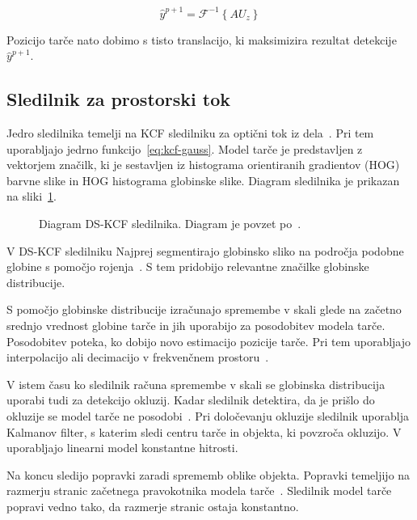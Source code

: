 \begin{equation}
\hat{y}^{p + 1} = \mathcal{F}^{-1}\left\{ A U_z \right\}
\label{eq:detection-score}
\end{equation}

Pozicijo tarče nato dobimo s tisto translacijo, ki maksimizira rezultat detekcije $\hat{y}^{p+1}$.












\subsection{Sledilnik za prostorski tok}
Jedro sledilnika temelji na KCF sledilniku za optični tok iz dela~\cite{henriques2015high}. Pri tem uporabljajo jedrno funkcijo~\eqref{eq:kcf-gauss}. Model tarče je predstavljen z vektorjem značilk, ki je sestavljen iz histograma orientiranih gradientov (HOG) barvne slike in HOG histograma globinske slike. Diagram sledilnika je prikazan na sliki~\ref{fig:diagram-dskcf}.

\begin{figure}[htb]
	\centering
	
	\caption[Diagram DS-KCF sledilnika]{Diagram DS-KCF sledilnika. Diagram je povzet po~\cite{hannuna2016ds}.}
	\label{fig:diagram-dskcf}
\end{figure}

V DS-KCF sledilniku Najprej segmentirajo globinsko sliko na področja podobne globine s pomočjo rojenja~\cite{hannuna2016ds}. S tem pridobijo relevantne značilke globinske distribucije. 

S pomočjo globinske distribucije izračunajo spremembe v skali glede na začetno srednjo vrednost globine tarče in jih uporabijo za posodobitev modela tarče. Posodobitev poteka, ko dobijo novo estimacijo pozicije tarče. Pri tem uporabljajo interpolacijo ali decimacijo v frekvenčnem prostoru~\cite{hannuna2016ds}.

V istem času ko sledilnik računa spremembe v skali se globinska distribucija uporabi tudi za detekcijo okluzij. Kadar sledilnik detektira, da je prišlo do okluzije se model tarče ne posodobi~\cite{hannuna2016ds}. Pri določevanju okluzije sledilnik uporablja Kalmanov filter, s katerim sledi centru tarče in objekta, ki povzroča okluzijo. V~\cite{hannuna2016ds} uporabljajo linearni model konstantne hitrosti.  

Na koncu sledijo popravki zaradi sprememb oblike objekta. Popravki temeljijo na razmerju stranic začetnega pravokotnika modela tarče~\cite{hannuna2016ds}. Sledilnik model tarče popravi vedno tako, da razmerje stranic ostaja konstantno.





